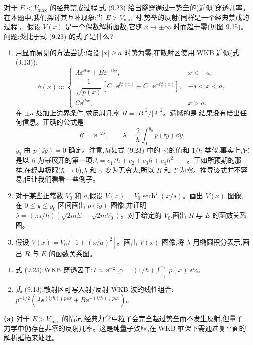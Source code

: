 \begin{question}
对于 $E<V_{\max}$ 的经典禁戒过程,式 (9.23) 给出隧穿通过一势垒的(近似)穿透几率。在本题中,我们探讨其互补现象:当 $E>V_{\max}$ 时,势垒的反射(同样是一个经典禁戒的过程)。假设 $V(x)$ 是一个偶数解析函数,它随 $x\to\pm\infty$ 时而趋于零(见图 9.15)。问题:类比于式 (9.23) 的式子是什么?
\begin{enumerate}
\item 用显而易见的方法尝试:假设 $|x|\ge a$ 时势为零,在散射区使用 WKB 近似(式 (9.13)):
\[
\psi(x)\approx\begin{cases}
A\ee^{\ii kx}+B\ee^{-\ii kx}, & x<-a,\\
\dfrac{1}{\sqrt{p(x)}}\left[C_+\ee^{\ii\phi(x)}+C_-\ee^{-\ii\phi(x)}\right], & -a<x<a,\\
C\ee^{\ii kx}, & x>a.
\end{cases}
\]
在 $\pm a$ 处加上边界条件,求反射几率 $R=|B|^2/|A|^2$。遗憾的是,结果没有给出任何信息。正确的公式是
\[
R=\ee^{-2\lambda},\qquad \lambda=\frac{2}{\hbar}\int_0^{y_0}p(\ii y)\,\dd y,
\]
$y_0$ 由 $p(\ii y)=0$ 确定。注意,$\lambda$(如式 (9.23) 中的 $\gamma$)的值和 $1/\hbar$ 类似;事实上,它是以 $\hbar$ 为幂展开的第一项:$\lambda=c_1/\hbar+c_2+c_3\hbar+c_4\hbar^2+\cdots$。正如所预期的那样,在经典极限($\hbar\to0$),$\lambda$ 和 $\gamma$ 变为无穷大,所以 $R$ 和 $T$ 为零。推导该式并不容易,但让我们看看一些例子。
\item 对于某些正常数 $V_0$ 和 $a$,假设 $V(x)=V_0\operatorname{sech}^2(x/a)$。画出 $V(x)$ 图像,在 $0\le y\le y_0$ 区间画出 $p(\ii y)$ 图像,并证明 $\lambda=(\pi a/\hbar)(\sqrt{2mE}-\sqrt{2mV_0})$。对于给定的 $V_0$,画出 $R$ 与 $E$ 的函数关系图。
\item 假设 $V(x)=V_0/[1+(x/a)^2]$。画出 $V(x)$ 图像,将 $\lambda$ 用椭圆积分表示,画出 $R$ 与 $E$ 的函数关系图。
\end{enumerate}

\par\smallskip
{}
\begin{enumerate}[leftmargin=2.2em,itemsep=0.12em,topsep=0.12em,parsep=0pt]
\item 式 (9.23):WKB 穿透因子:$T\approx \ee^{-2\gamma}$,$\gamma=(1/\hbar)\int_{x_1}^{x_2}|p(x)|\dd x$。
\item 式 (9.13):散射区可写入射/反射 WKB 波的线性组合:$p^{-1/2}(A\ee^{(\ii/\hbar)\int p\dd x}+B\ee^{-(\ii/\hbar)\int p\dd x})$。
\end{enumerate}

\begin{solution}
\textbf{(a)} 对于 $E>V_{\max}$ 的情况,经典力学中粒子会完全越过势垒而不发生反射,但量子力学中仍存在非零的反射几率。这是纯量子效应,在 WKB 框架下需通过复平面的解析延拓来处理。


\end{solution}
\end{question}
